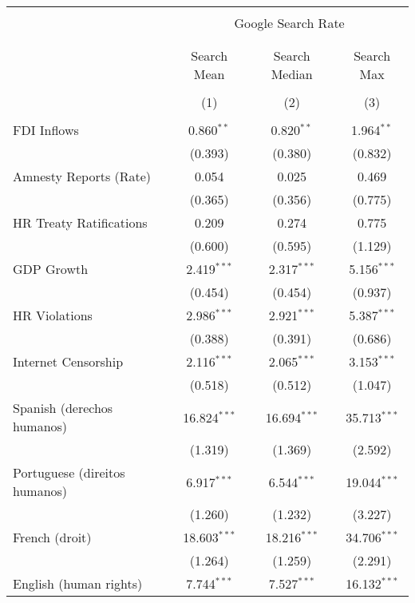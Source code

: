 
\begin{table}[!htbp] \centering 
  \caption{} 
  \label{} 
\begin{tabular}{@{\extracolsep{5pt}}lccc} 
\\[-1.8ex]\hline 
\hline \\[-1.8ex] 
 & \multicolumn{3}{c}{Google Search Rate} \\ 
\cline{2-4} 
\\[-1.8ex] & \multicolumn{3}{c}{ } \\ 
 & Search Mean & Search Median & Search Max \\ 
\\[-1.8ex] & (1) & (2) & (3)\\ 
\hline \\[-1.8ex] 
 FDI Inflows & 0.860$^{**}$ & 0.820$^{**}$ & 1.964$^{**}$ \\ 
  & (0.393) & (0.380) & (0.832) \\ 
  Amnesty Reports (Rate) & 0.054 & 0.025 & 0.469 \\ 
  & (0.365) & (0.356) & (0.775) \\ 
  HR Treaty Ratifications & 0.209 & 0.274 & 0.775 \\ 
  & (0.600) & (0.595) & (1.129) \\ 
  GDP Growth & 2.419$^{***}$ & 2.317$^{***}$ & 5.156$^{***}$ \\ 
  & (0.454) & (0.454) & (0.937) \\ 
  HR Violations & 2.986$^{***}$ & 2.921$^{***}$ & 5.387$^{***}$ \\ 
  & (0.388) & (0.391) & (0.686) \\ 
  Internet Censorship & 2.116$^{***}$ & 2.065$^{***}$ & 3.153$^{***}$ \\ 
  & (0.518) & (0.512) & (1.047) \\ 
  Spanish (derechos humanos) & 16.824$^{***}$ & 16.694$^{***}$ & 35.713$^{***}$ \\ 
  & (1.319) & (1.369) & (2.592) \\ 
  Portuguese (direitos humanos) & 6.917$^{***}$ & 6.544$^{***}$ & 19.044$^{***}$ \\ 
  & (1.260) & (1.232) & (3.227) \\ 
  French (droit) & 18.603$^{***}$ & 18.216$^{***}$ & 34.706$^{***}$ \\ 
  & (1.264) & (1.259) & (2.291) \\ 
  English (human rights) & 7.744$^{***}$ & 7.527$^{***}$ & 16.132$^{***}$ \\ 

\end{tabular}
\end{table}
